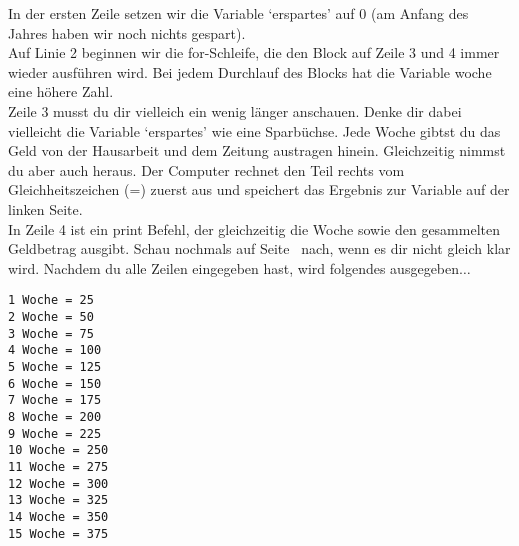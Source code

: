 In der ersten Zeile setzen wir die Variable `erspartes' auf 0 (am Anfang des Jahres haben wir noch nichts gespart).\\
Auf Linie 2 beginnen wir die for-Schleife, die den Block auf Zeile 3 und 4 immer wieder ausführen wird. Bei jedem Durchlauf des Blocks hat die Variable woche eine höhere Zahl.\\
Zeile 3 musst du dir vielleich ein wenig länger anschauen. Denke dir dabei vielleicht die Variable `erspartes' wie eine Sparbüchse. Jede Woche gibtst du das Geld von der Hausarbeit und dem Zeitung austragen hinein. Gleichzeitig nimmst du aber auch  heraus. Der Computer rechnet den Teil rechts vom Gleichheitszeichen (=) zuerst aus und speichert das Ergebnis zur Variable auf der linken Seite.\\
In Zeile 4 ist ein print Befehl, der gleichzeitig die Woche sowie den gesammelten Geldbetrag ausgibt. Schau nochmals auf Seite~\pageref{trickswithstrings} nach, wenn es dir nicht gleich klar wird. Nachdem du alle Zeilen eingegeben hast, wird folgendes ausgegeben$\ldots$

\begin{Verbatim}[frame=single]
1 Woche = 25
2 Woche = 50
3 Woche = 75
4 Woche = 100
5 Woche = 125
6 Woche = 150
7 Woche = 175
8 Woche = 200
9 Woche = 225
10 Woche = 250
11 Woche = 275
12 Woche = 300
13 Woche = 325
14 Woche = 350
15 Woche = 375
\end{Verbatim}

